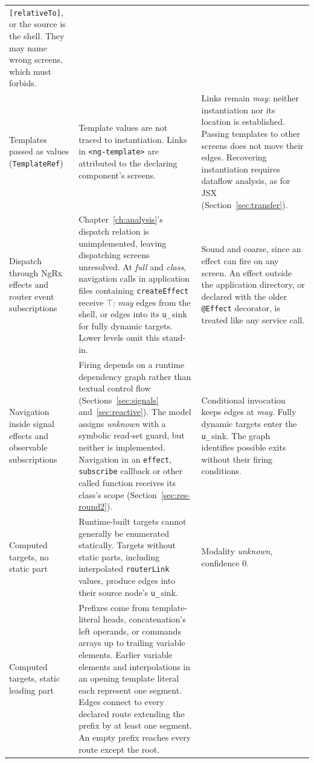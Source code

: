 \begin{xltabular}{\textwidth}{@{}>{\raggedright\arraybackslash}p{2.7cm}YY@{}}
\texttt{[relativeTo]}, or the source is the shell. They may name wrong screens, which must forbids. \\
Templates passed as values (\texttt{TemplateRef})
& Template values are not traced to instantiation. Links in \texttt{<ng-template>} are attributed
to the declaring component's screens.
& Links remain \emph{may}: neither instantiation nor its location is established. Passing
templates to other screens does not move their edges. Recovering instantiation requires dataflow
analysis, as for JSX (Section~\ref{sec:transfer}). \\
Dispatch through NgRx effects and router event subscriptions
& Chapter~\ref{ch:analysis}'s dispatch relation is unimplemented, leaving dispatching screens unresolved.
At \emph{full} and \emph{class}, navigation calls in application files containing
\texttt{createEffect} receive $\top$: \emph{may} edges from the shell, or edges into its \texttt{u\_}\,sink
for fully dynamic targets. Lower levels omit this stand-in.
& Sound and coarse, since an effect can fire on any screen.
An effect outside the application directory, or declared with the older \texttt{@Effect} decorator,
is treated like any service call. \\
Navigation inside signal effects and observable subscriptions
& Firing depends on a runtime dependency graph rather than textual control flow
(Sections~\ref{sec:signals} and~\ref{sec:reactive}). The model assigns \emph{unknown} with a symbolic
read-set guard, but neither is implemented. Navigation in an \texttt{effect}, \texttt{subscribe}
callback or other called function receives its class's scope (Section~\ref{sec:res-round2}).
& Conditional invocation keeps edges at \emph{may}. Fully dynamic targets enter the \texttt{u\_}\,sink.
The graph identifies possible exits without their firing conditions. \\
Computed targets, no static part
& Runtime-built targets cannot generally be enumerated statically. Targets without static parts,
including interpolated \texttt{routerLink} values, produce edges into their source node's \texttt{u\_}\,sink.
& Modality \emph{unknown}, confidence 0. \\
Computed targets, static leading part
& Prefixes come from template-literal heads, concatenation's left operands, or commands arrays up to
trailing variable elements. Earlier variable elements and interpolations in an opening template literal
each represent one segment. Edges connect to every declared route extending the prefix by at least
one segment. An empty prefix reaches every route except the root.

\end{xltabular}
